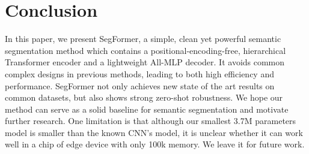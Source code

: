 \section{Conclusion}   \label{sec:concl}
In this paper, we present SegFormer, a simple, clean yet powerful semantic segmentation method which contains a positional-encoding-free, hierarchical Transformer encoder and a lightweight All-MLP decoder. 
It avoids common complex designs in previous methods, leading to both high efficiency and performance. 
SegFormer not only achieves new state of the art results on common datasets, but also shows strong zero-shot robustness. We hope our method can serve as a solid baseline for semantic segmentation and motivate further research. One limitation is that although our smallest 3.7M parameters model is smaller than the known CNN's model, it is unclear whether it can work well in a chip of edge device with only 100k memory. We leave it for future work.